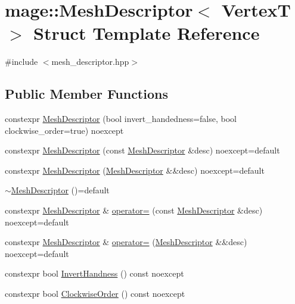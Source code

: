 \hypertarget{structmage_1_1_mesh_descriptor}{}\section{mage\+:\+:Mesh\+Descriptor$<$ VertexT $>$ Struct Template Reference}
\label{structmage_1_1_mesh_descriptor}


{\ttfamily \#include $<$mesh\+\_\+descriptor.\+hpp$>$}

\subsection*{Public Member Functions}
\begin{DoxyCompactItemize}
\item 
constexpr \hyperlink{structmage_1_1_mesh_descriptor_a4289c5df5350c5fd8277c16bd9af1f8b}{Mesh\+Descriptor} (bool invert\+\_\+handedness=false, bool clockwise\+\_\+order=true) noexcept
\item 
constexpr \hyperlink{structmage_1_1_mesh_descriptor_acd54e4ddefa6bf74bfa3b26157420995}{Mesh\+Descriptor} (const \hyperlink{structmage_1_1_mesh_descriptor}{Mesh\+Descriptor} \&desc) noexcept=default
\item 
constexpr \hyperlink{structmage_1_1_mesh_descriptor_ac3f244d5705c6435d5ff4b369e5e929d}{Mesh\+Descriptor} (\hyperlink{structmage_1_1_mesh_descriptor}{Mesh\+Descriptor} \&\&desc) noexcept=default
\item 
\hyperlink{structmage_1_1_mesh_descriptor_adca32db164ab3032164c8dfe17af3db4}{$\sim$\+Mesh\+Descriptor} ()=default
\item 
constexpr \hyperlink{structmage_1_1_mesh_descriptor}{Mesh\+Descriptor} \& \hyperlink{structmage_1_1_mesh_descriptor_a3831ecd926f70193fffb70c65ca9e8ff}{operator=} (const \hyperlink{structmage_1_1_mesh_descriptor}{Mesh\+Descriptor} \&desc) noexcept=default
\item 
constexpr \hyperlink{structmage_1_1_mesh_descriptor}{Mesh\+Descriptor} \& \hyperlink{structmage_1_1_mesh_descriptor_a4076b38f6ab4c567c2aa459cdf815796}{operator=} (\hyperlink{structmage_1_1_mesh_descriptor}{Mesh\+Descriptor} \&\&desc) noexcept=default
\item 
constexpr bool \hyperlink{structmage_1_1_mesh_descriptor_ac3caa13f3da024ca3aa1a228ebaacc53}{Invert\+Handness} () const noexcept
\item 
constexpr bool \hyperlink{structmage_1_1_mesh_descriptor_addf1fbbe9f1433ca9697eaf14e5ffa22}{Clockwise\+Order} () const noexcept
\end{DoxyCompactItemize}
